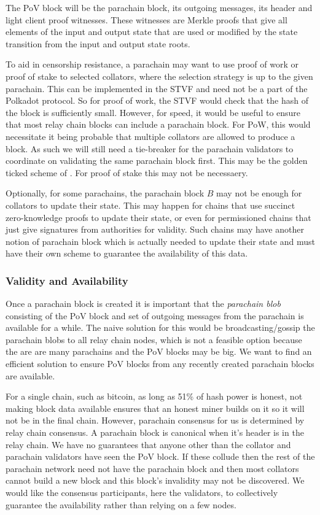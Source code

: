 The PoV block will be the parachain block, its outgoing messages, its header and light client proof witnesses. These witnesses are Merkle proofs that give all elements of the input and output state that are used or modified by the state transition from the input and output state roots.


To aid in censorship resistance, a parachain may want to use proof of work or proof of stake to selected collators, where the selection strategy is up to the given parachain.
This can be implemented in the STVF and need not be a part of the Polkadot protocol. So for proof of work,
the STVF would check that the hash of the block is sufficiently small.
However, for speed, it would be useful to ensure that most relay chain blocks can include a parachain block.
For PoW, this would necessitate it being probable that multiple collators are allowed to produce a block.
As such we will still need a tie-breaker for the parachain validators to coordinate on validating the same parachain block first.
This may be the golden ticked scheme of \cite{2016:Wood:Polkadot}. For proof of stake this may not be necessaery.

Optionally, for some parachains, the parachain block $B$ may not be enough for collators to update their state. This may happen for chains that use succinct zero-knowledge proofs to update their state, or even for permissioned chains that just give signatures from authorities for validity. Such chains may have another notion of parachain block which is actually needed to update their state and must have their own scheme to guarantee the availability of this data.





\subsubsection{Validity and Availability} \label{sec:validity-and-availability}
Once a parachain block is created it is important that the {\em parachain blob} consisting of the PoV block and set of outgoing messages from the parachain is available for a while.
The naive solution for this would be broadcasting/gossip the parachain blobs to all relay chain nodes, which is not a feasible option because the are are many parachains and the PoV blocks may be big.
We want to find an efficient solution to ensure PoV blocks from any recently created parachain blocks are available.

For a single chain, such as bitcoin, as long as 51\% of hash power is honest, not making block data available ensures that an honest miner builds on it so it will not be in the final chain. However, parachain consensus for us is determined by relay chain consensus.
A parachain block is canonical when it's header is in the relay chain.
We have no guarantees that anyone other than the collator and parachain validators have seen the PoV block.
If these collude then the rest of the parachain network need not have the parachain block and then most collators cannot build a new block and this block's invalidity may not be discovered.
We would like the consensus participants, here the validators, to collectively guarantee the availability rather than relying on a few nodes.

